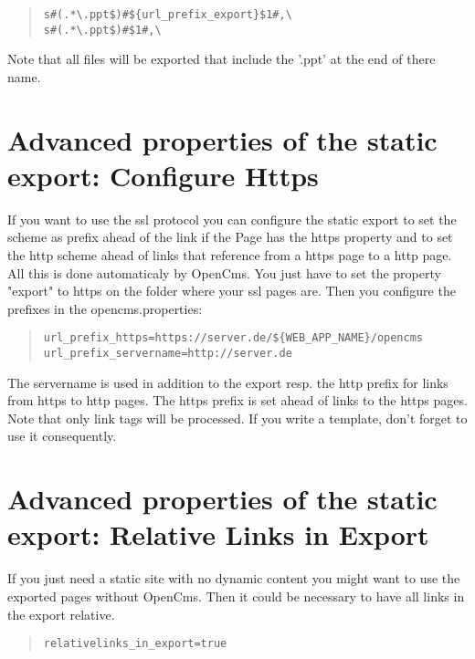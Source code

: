 \begin{quote}
\begin{verbatim}
s#(.*\.ppt$)#${url_prefix_export}$1#,\
s#(.*\.ppt$)#$1#,\
\end{verbatim}
\end{quote}

Note that all files will be exported that include the '.ppt' at the end of there name.

\section{Advanced properties of the static export: Configure Https}

If you want to use the ssl protocol you can configure the static export to set the scheme as prefix ahead of the link if the Page has the https property and to set the http scheme ahead of links that reference from a https page to a http page. 
All this is done automaticaly by OpenCms. You just have to set the property "export" to https on the folder where your ssl pages are. Then you configure the prefixes in the opencms.properties:

\begin{quote}
\begin{verbatim}
url_prefix_https=https://server.de/${WEB_APP_NAME}/opencms
url_prefix_servername=http://server.de
\end{verbatim}
\end{quote}

The servername is used in addition to the export resp. the http prefix for links from https to http pages. The https prefix is set ahead of links to the https pages. Note that only link tags will be processed. If you write a template, don't forget to use it consequently.

\section{Advanced properties of the static export: Relative Links in Export}

If you just need a static site with no dynamic content you might want to use the exported pages without OpenCms. Then it could be necessary to have all links in the export relative. 

\begin{quote}
\begin{verbatim}
relativelinks_in_export=true
\end{verbatim}
\end{quote}

